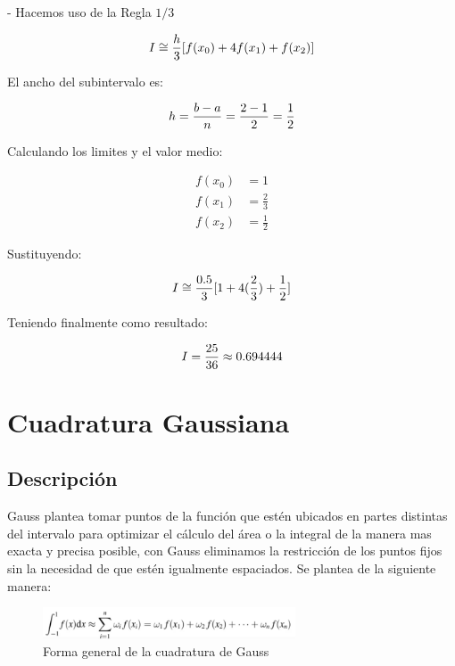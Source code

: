 \documentclass[journal,transmag]{IEEEtran}
\theoremstyle{mytheoremstyle}
\theoremstyle{mytheoremstyle}
\theoremstyle{myproblemstyle}
\begin{document}
            - Hacemos uso de la Regla $1/3$

            \begin{equation} \notag
                I \cong \frac{h}{3}[f(x_0) + 4f(x_1) + f(x_2)]
            \end{equation}

            El ancho del subintervalo es:

            \begin{equation} \notag
                h = \frac{b - a}{n} = \frac{2 - 1}{2} = \frac{1}{2}
            \end{equation}

            Calculando los limites y el valor medio:

            \begin{align*}
                f(x_0) &= 1 \\
                f(x_1) &= \frac{2}{3} \\
                f(x_2) &= \frac{1}{2}
            \end{align*}

            Sustituyendo:

            \begin{equation} \notag
                I \cong \frac{0.5}{3}[1 + 4(\frac{2}{3}) + \frac{1}{2}]
            \end{equation}

            Teniendo finalmente como resultado:

            \begin{equation} \notag
                I = \frac{25}{36} \approx 0.694444 
            \end{equation}

            \section{Cuadratura Gaussiana}
            \subsection{Descripción}
            Gauss plantea tomar puntos de la función que estén ubicados en partes distintas del intervalo para optimizar el cálculo del área o la integral de la manera mas exacta y precisa posible, con Gauss eliminamos la restricción de los puntos fijos sin la necesidad de que estén igualmente espaciados.
            Se plantea de la siguiente manera: 
            
            \begin{figure}[h]
                \centering
                \includegraphics[width=7.5cm ]{images/gauss.PNG}
                \caption{Forma general de la cuadratura de Gauss}
                \label{Formula de Gaussl}
            \end{figure}
            
\end{document}
